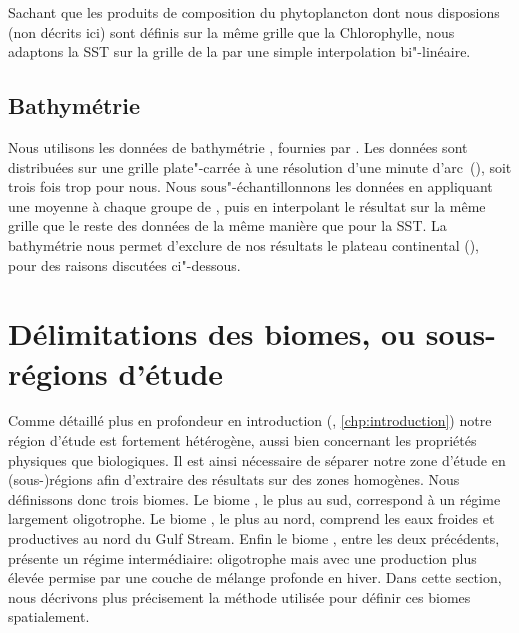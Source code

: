 Sachant que les produits de composition du phytoplancton dont nous disposions (non décrits ici) sont définis sur la même grille que la Chlorophylle, nous adaptons la SST sur la grille de la  par une simple interpolation bi"-linéaire.

\subsection{Bathymétrie}
\label{sec:donnees-bathymetrie}

Nous utilisons les données de bathymétrie , fournies par .
Les données sont distribuées sur une grille plate"-carrée à une résolution d'une minute d'arc~(), soit trois fois trop pour nous.
Nous sous"-échantillonnons les données en appliquant une moyenne à chaque groupe de , puis en interpolant le résultat sur la même grille que le reste des données de la même manière que pour la SST.
La bathymétrie nous permet d'exclure de nos résultats le plateau continental (), pour des raisons discutées ci"-dessous.

\begin{figure}
  \centering
  \label{fig:bathymetrie}
\end{figure}

\section{Délimitations des biomes, ou sous-régions d'étude}
\label{sec:delimitations-regions}

Comme détaillé plus en profondeur en introduction (, \cref*{chp:introduction}) notre région d'étude est fortement hétérogène, aussi bien concernant les propriétés physiques que biologiques.
Il est ainsi nécessaire de séparer notre zone d'étude en (sous-)régions afin d'extraire des résultats sur des zones homogènes.
Nous définissons donc trois biomes.
Le biome , le plus au sud, correspond à un régime largement oligotrophe.
Le biome , le plus au nord, comprend les eaux froides et productives au nord du Gulf Stream.
Enfin le biome , entre les deux précédents, présente un régime intermédiaire: oligotrophe mais avec une production plus élevée permise par une couche de mélange profonde en hiver.
Dans cette section, nous décrivons plus précisement la méthode utilisée pour définir ces biomes spatialement.


